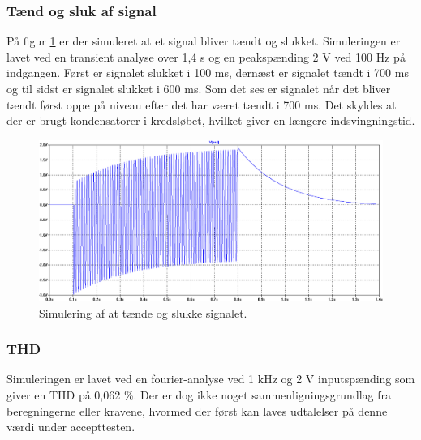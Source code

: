 \subsubsection*{Tænd og sluk af signal}
På figur \ref{indgangsvaelger_taendsluk} er der simuleret at et signal bliver tændt og slukket. Simuleringen er lavet ved en transient analyse over 1,4 s og en peakspænding 2 V ved 100 Hz på indgangen. Først er signalet slukket i 100 ms, dernæst er signalet tændt i 700 ms og til sidst er signalet slukket i 600 ms. Som det ses er signalet når det bliver tændt først oppe på niveau efter det har været tændt i 700 ms. Det skyldes at der er brugt kondensatorer i kredsløbet, hvilket giver en længere indsvingningstid.
\begin{figure}[h]
\centering
\includegraphics[width=\textwidth]{teknisk/indgangsvaelger/simulering/taend_sluk.png}
\caption{Simulering af at tænde og slukke signalet.}
\label{indgangsvaelger_taendsluk}
\end{figure}

\subsubsection*{THD}
Simuleringen er lavet ved en fourier-analyse ved 1 kHz og 2 V inputspænding som giver en THD på 0,062 \%. Der er dog ikke noget sammenligningsgrundlag fra beregningerne eller kravene, hvormed der først kan laves udtalelser på denne værdi under accepttesten. 
